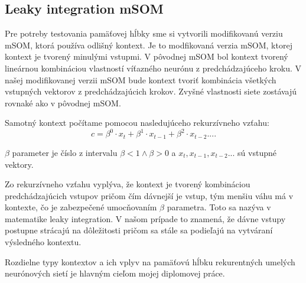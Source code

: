 \subsection{Leaky integration mSOM}
Pre potreby testovania pamäťovej hĺbky sme si vytvorili modifikovanú verziu mSOM, 
ktorá používa odlišný kontext.
Je to modfikovaná verzia mSOM, ktorej kontext je tvorený minulými vstupmi.
V pôvodnej mSOM bol kontext tvorený lineárnou kombináciou vlastností víťazného neurónu z predchádzajúceho kroku.
V našej modifikovanej verzii mSOM bude kontext tvoriť kombinácia všetkých vstupných vektorov z predchádzajúcich krokov.
Zvyšné vlastnosti siete zostávajú rovnaké ako v pôvodnej mSOM. 

Samotný kontext počítame pomocou nasledujúceho rekurzívneho vzťahu:
\begin{equation}
	c = \beta^{0} \cdot x_{t} + \beta^{1} \cdot x_{t-1} + 
	\beta^{2} \cdot x_{t-2}....
\end{equation}

$\beta$ parameter je číslo z intervalu $\beta < 1 \wedge \beta > 0$ a
$x_t, x_{t-1}, x_{t-2} ...$ sú vstupné vektory.

Zo rekurzívneho vzťahu vyplýva, že kontext je tvorený kombináciou predchádzajúcich vstupov
pričom čím dávnejší je vstup, tým menšiu váhu má v kontexte, čo je zabezpečené umocňovaním
$\beta$ parametra. Toto sa nazýva v matematike leaky integration. V našom prípade
to znamená, že dávne vstupy postupne strácajú na dôležitosti pričom sa stále sa podieľajú 
na vytváraní výsledného kontextu.


Rozdielne typy kontextov a ich vplyv na pamäťovú hĺbku rekurentných 
umelých neurónových sietí je hlavným cieľom mojej diplomovej práce.
